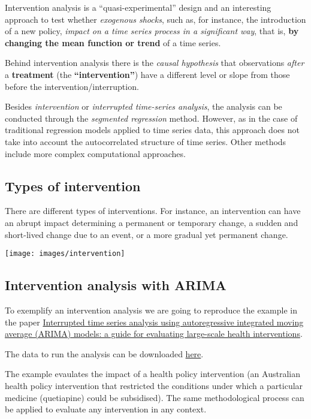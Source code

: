 \documentclass[
]{article}
\begin{document}
Intervention analysis is a ``quasi-experimental'' design and an interesting approach to test whether \emph{exogenous shocks}, such as, for instance, the introduction of a new policy, \emph{impact on a time series process in a significant way}, that is, \textbf{by changing the mean function or trend} of a time series.

Behind intervention analysis there is the \emph{causal hypothesis} that observations \emph{after} a \textbf{treatment} (the \textbf{``intervention''}) have a different level or slope from those before the intervention/interruption.

Besides \emph{intervention} or \emph{interrupted time-series analysis}, the analysis can be conducted through the \emph{segmented regression} method. However, as in the case of traditional regression models applied to time series data, this approach does not take into account the autocorrelated structure of time series. Other methods include more complex computational approaches.

\subsection{Types of intervention}\label{types-of-intervention}

There are different types of interventions. For instance, an intervention can have an abrupt impact determining a permanent or temporary change, a sudden and short-lived change due to an event, or a more gradual yet permanent change.

\texttt{[image: images/intervention]}

\subsection{Intervention analysis with ARIMA}\label{intervention-analysis-with-arima}

To exemplify an intervention analysis we are going to reproduce the example in the paper \href{https://bmcmedresmethodol.biomedcentral.com/articles/10.1186/s12874-021-01235-8\#Sec13}{Interrupted time series analysis using autoregressive integrated moving average (ARIMA) models: a guide for evaluating large-scale health interventions}.

The data to run the analysis can be downloaded \href{https://static-content.springer.com/esm/art\%3A10.1186\%2Fs12874-021-01235-8/MediaObjects/12874_2021_1235_MOESM1_ESM.csv}{here}.

The example evaulates the impact of a health policy intervention (an Australian health policy intervention that restricted the conditions under which a particular medicine (quetiapine) could be subsidised). The same methodological process can be applied to evaluate any intervention in any context.
\end{document}
